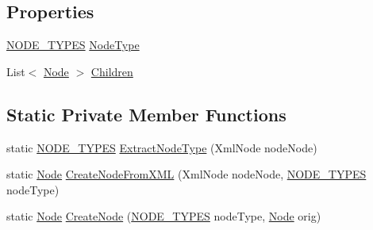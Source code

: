 \subsection*{Properties}
\begin{DoxyCompactItemize}
\item 
\hyperlink{class_web_analyzer_1_1_models_1_1_settings_model_1_1_expression_tree_1_1_node_a89c72b19ff778cbc04788f4cb47a730e}{N\+O\+D\+E\+\_\+\+T\+Y\+P\+E\+S} \hyperlink{class_web_analyzer_1_1_models_1_1_settings_model_1_1_expression_tree_1_1_node_a326bab10d73a525224fcf5b061491dda}{Node\+Type}
\item 
List$<$ \hyperlink{class_web_analyzer_1_1_models_1_1_settings_model_1_1_expression_tree_1_1_node}{Node} $>$ \hyperlink{class_web_analyzer_1_1_models_1_1_settings_model_1_1_expression_tree_1_1_node_af97835cf31c19c83f0044bbd6f4a9e91}{Children}
\end{DoxyCompactItemize}
\subsection*{Static Private Member Functions}
\begin{DoxyCompactItemize}
\item 
static \hyperlink{class_web_analyzer_1_1_models_1_1_settings_model_1_1_expression_tree_1_1_node_a89c72b19ff778cbc04788f4cb47a730e}{N\+O\+D\+E\+\_\+\+T\+Y\+P\+E\+S} \hyperlink{class_web_analyzer_1_1_models_1_1_settings_model_1_1_expression_tree_1_1_node_ae1efb2639fc04b709b1adbd3566a8162}{Extract\+Node\+Type} (Xml\+Node node\+Node)
\item 
static \hyperlink{class_web_analyzer_1_1_models_1_1_settings_model_1_1_expression_tree_1_1_node}{Node} \hyperlink{class_web_analyzer_1_1_models_1_1_settings_model_1_1_expression_tree_1_1_node_a1ca08dcd343feb5bf309c2702fcfa46e}{Create\+Node\+From\+X\+M\+L} (Xml\+Node node\+Node, \hyperlink{class_web_analyzer_1_1_models_1_1_settings_model_1_1_expression_tree_1_1_node_a89c72b19ff778cbc04788f4cb47a730e}{N\+O\+D\+E\+\_\+\+T\+Y\+P\+E\+S} node\+Type)
\item 
static \hyperlink{class_web_analyzer_1_1_models_1_1_settings_model_1_1_expression_tree_1_1_node}{Node} \hyperlink{class_web_analyzer_1_1_models_1_1_settings_model_1_1_expression_tree_1_1_node_a137870d8c98d82705273158fab0f4fcb}{Create\+Node} (\hyperlink{class_web_analyzer_1_1_models_1_1_settings_model_1_1_expression_tree_1_1_node_a89c72b19ff778cbc04788f4cb47a730e}{N\+O\+D\+E\+\_\+\+T\+Y\+P\+E\+S} node\+Type, \hyperlink{class_web_analyzer_1_1_models_1_1_settings_model_1_1_expression_tree_1_1_node}{Node} orig)
\end{DoxyCompactItemize}



